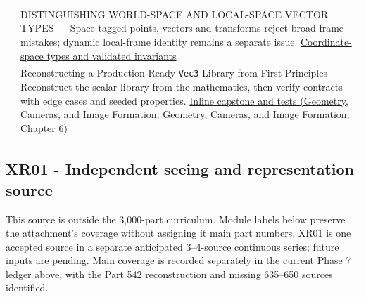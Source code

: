 {\begin{longtable}[]{@{}
  >{\raggedright\arraybackslash}p{}
  >{\raggedright\arraybackslash}p{}@{}}
599 & DISTINGUISHING WORLD-SPACE AND LOCAL-SPACE VECTOR TYPES --- Space-tagged points, vectors and transforms reject broad frame mistakes; dynamic local-frame identity remains a separate issue. \hyperref[appendix-380a220e2529]{Coordinate-space types and validated invariants} \\
600 & Reconstructing a Production-Ready \texttt{Vec3} Library from First Principles --- Reconstruct the scalar library from the mathematics, then verify contracts with edge cases and seeded properties. \href{../03-Geometry-Cameras-and-Image-Formation/main.pdf\#nameddest=02-foundations-ii-ch037-a-complete-scalar-laboratory-makes-the-story-executable}{Inline capstone and tests (Geometry, Cameras, and Image Formation, Geometry, Cameras, and Image Formation, Chapter 6)} \\
\end{longtable}
}

\subsection{XR01 - Independent seeing and representation source}\label{appendix-fd090d982a15-xr01---independent-seeing-and-representation-source}

This source is outside the 3,000-part curriculum. Module labels below preserve the attachment's coverage without assigning it main part numbers. XR01 is one accepted source in a separate anticipated 3--4-source continuous series; future inputs are pending. Main coverage is recorded separately in the current Phase 7 ledger above, with the Part 542 reconstruction and missing 635--650 sources identified.

